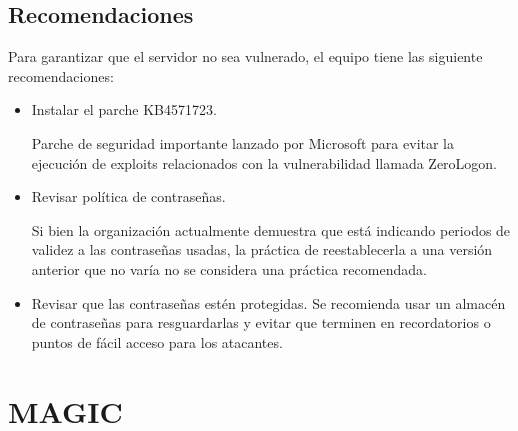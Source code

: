 \documentclass{article}
\begin{document}
\subsection{Recomendaciones}
Para garantizar que el servidor no sea vulnerado, el equipo tiene las siguiente recomendaciones:
\begin{itemize}
	\item Instalar el parche KB4571723.
	
	Parche de seguridad importante lanzado por Microsoft para evitar la ejecución de exploits relacionados con la vulnerabilidad llamada ZeroLogon.
	\item Revisar política de contraseñas.
	
	Si bien la organización actualmente demuestra que está indicando periodos de validez a las contraseñas usadas, la práctica de reestablecerla a una versión anterior que no varía no se considera una práctica recomendada.

	\item Revisar que las contraseñas estén protegidas.
	Se recomienda usar un almacén de contraseñas para resguardarlas y evitar que terminen en recordatorios o puntos de fácil acceso para los atacantes.
\end{itemize}

\clearpage 

\section{MAGIC}
\end{document}
